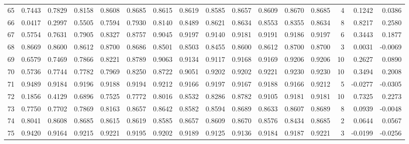 \begin{tabular}{lrrrrrrrrrrrrrrr}
65  &      0.7443 &  0.7829 &  0.8158 &  0.8608 &  0.8685 &  0.8615 &  0.8619 &  0.8585 &  0.8657 &  0.8609 &   0.8670 &     0.8685 &      4 &                    0.1242 &                     0.0386 \\
66  &      0.0417 &  0.2997 &  0.5505 &  0.7594 &  0.7930 &  0.8140 &  0.8489 &  0.8621 &  0.8634 &  0.8553 &   0.8355 &     0.8634 &      8 &                    0.8217 &                     0.2580 \\
67  &      0.5754 &  0.7631 &  0.7905 &  0.8327 &  0.8757 &  0.9045 &  0.9197 &  0.9140 &  0.9181 &  0.9191 &   0.9186 &     0.9197 &      6 &                    0.3443 &                     0.1877 \\
68  &      0.8669 &  0.8600 &  0.8612 &  0.8700 &  0.8686 &  0.8501 &  0.8503 &  0.8455 &  0.8600 &  0.8612 &   0.8700 &     0.8700 &      3 &                    0.0031 &                    -0.0069 \\
69  &      0.6579 &  0.7469 &  0.7866 &  0.8221 &  0.8789 &  0.9063 &  0.9134 &  0.9117 &  0.9168 &  0.9169 &   0.9206 &     0.9206 &     10 &                    0.2627 &                     0.0890 \\
70  &      0.5736 &  0.7744 &  0.7782 &  0.7969 &  0.8250 &  0.8722 &  0.9051 &  0.9202 &  0.9202 &  0.9221 &   0.9230 &     0.9230 &     10 &                    0.3494 &                     0.2008 \\
71  &      0.9489 &  0.9184 &  0.9196 &  0.9188 &  0.9194 &  0.9212 &  0.9166 &  0.9197 &  0.9167 &  0.9188 &   0.9166 &     0.9212 &      5 &                   -0.0277 &                    -0.0305 \\
72  &      0.1856 &  0.4129 &  0.6896 &  0.7525 &  0.7772 &  0.8016 &  0.8532 &  0.8286 &  0.8782 &  0.9105 &   0.9181 &     0.9181 &     10 &                    0.7325 &                     0.2273 \\
73  &      0.7750 &  0.7702 &  0.7869 &  0.8163 &  0.8657 &  0.8642 &  0.8582 &  0.8594 &  0.8689 &  0.8633 &   0.8607 &     0.8689 &      8 &                    0.0939 &                    -0.0048 \\
74  &      0.8041 &  0.8608 &  0.8685 &  0.8615 &  0.8619 &  0.8585 &  0.8657 &  0.8609 &  0.8670 &  0.8576 &   0.8434 &     0.8685 &      2 &                    0.0644 &                     0.0567 \\
75  &      0.9420 &  0.9164 &  0.9215 &  0.9221 &  0.9195 &  0.9202 &  0.9189 &  0.9125 &  0.9136 &  0.9184 &   0.9187 &     0.9221 &      3 &                   -0.0199 &                    -0.0256 \\

\end{tabular}
